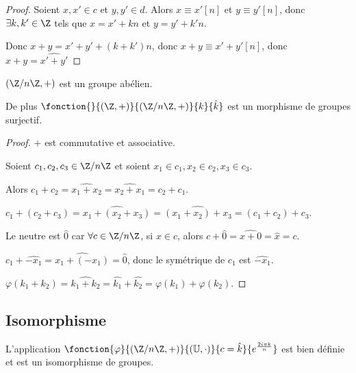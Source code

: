 \begin{proof}
    Soient $x, x' \in c$ et $y, y' \in d$.
    Alors $x \equiv x' [n]$ et $y \equiv y' [n]$, donc
    $\exists k, k' \in \Z$ tels que $x = x' + kn$ et $y = y' + k'n$.

    Donc $x + y = x' + y' + (k + k')n$, donc $x + y \equiv x' + y' [n]$,
    donc $\widehat{x + y} = \widehat{x' + y'}$
\end{proof}

\begin{theoreme}{}{}
    $(\Z/n\Z, +)$ est un groupe abélien.

    De plus $\fonction{}{(\Z, +)}{(\Z/n\Z, +)}{k}{\hat k}$ est un morphisme de groupes surjectif.
\end{theoreme}


\begin{proof}
    $+$ est commutative et associative. 

    Soient $c_1, c_2, c_3 \in \Z/n\Z$ et soient $x_1 \in c_1, x_2 \in c_2, x_3 \in c_3$.

    Alors $c_1 + c_2 = \widehat{x_1 + x_2} = \widehat{x_2 + x_1} = c_2 + c_1$.

    $c_1 + (c_2 + c_3) = \widehat{x_1 + (x_2 + x_3)} = \widehat{(x_1 + x_2) + x_3} = (c_1 + c_2) + c_3$.

    \avspace Le neutre est $\hat 0$ car $\forall c \in \Z/n\Z$, si $x \in c$, alors
    $c + \hat 0 = \widehat{x + 0} = \hat x = c$.

    \avspace $c_1 + \hat{-x_1} = \widehat{x_1 + (-x_1)} = \hat 0$, donc le symétrique de $c_1$ est $\hat{-x_1}$.

    \avspace $\varphi(k_1 + k_2) = \widehat{k_1 + k_2} = \hat{k_1} + \hat{k_2} = \varphi(k_1) + \varphi(k_2)$.
\end{proof}

\subsection{Isomorphisme }

\begin{theoreme}{}{}
    L'application $\fonction{\varphi}{(\Z/n\Z, +)}{(\mathbb U, \cdot)}{c = \hat k}{e^{\frac{2i\pi k} n}}$
    est bien définie et est un isomorphisme de groupes.
\end{theoreme}

